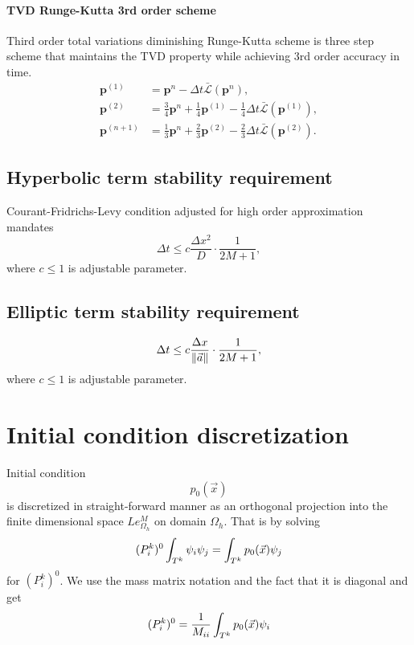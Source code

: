 \paragraph{TVD Runge-Kutta 3rd order scheme}
Third order total variations diminishing Runge-Kutta scheme \cite{Gottlieb2002} 
is three step scheme that maintains the TVD property while achieving 3rd order 
accuracy in time.
\begin{equation}	
	\begin{aligned}
		\mathbf{p}^{(1)} &= \mathbf{p}^n - \Delta t  
		\bar{\mathcal{L}}(\mathbf{p}^n), \\
		\mathbf{\mathbf{p}}^{(2)} &= \frac{3}{4}\mathbf{p}^n 
		+\frac{1}{4}\mathbf{p}^{(1)} - \frac{1}{4}\Delta t 
		 \bar{\mathcal{L}}(\mathbf{p}^{(1)}),\\
		\mathbf{p}^{(n+1)} &= \frac{1}{3}\mathbf{p}^n 
		+\frac{2}{3}\mathbf{p}^{(2)} - \frac{2}{3}\Delta t 
		 \bar{\mathcal{L}}(\mathbf{p}^{(2)}).
	\end{aligned}
\end{equation}


\subsection{Hyperbolic term stability requirement}
Courant-Fridrichs-Levy condition adjusted for high order approximation mandates 
\begin{equation}
	\Delta t \leq c\frac{\Delta x^2}{D} \cdot \frac{1}{2M + 1},
\end{equation} 
where $c \leq 1$ is adjustable parameter.


\subsection{Elliptic term stability requirement}
\begin{equation}\label{eq:cfl_cond}
	\Delta t \leq c\frac{\Delta x}{\left\lVert\vec{a}\right\rVert} \cdot \frac{1}{2M + 1},
\end{equation}
where $c \leq 1$ is adjustable parameter.

\newpage
\section{Initial condition discretization}
Initial condition 
$$
p_0(\vec{x})
$$
is discretized in straight-forward manner as an orthogonal projection into the 
finite dimensional space $Le_{\Omega_h}^{M}$ on domain $\Omega_h$. That is
by solving
\begin{equation}\label{eq:init_proj}
	(P^k_i)^0\int_{T^k}\psi_i\psi_j = \int_{T^k} p_0(\vec{x})\psi_j
\end{equation}
for $(P^k_i)^0$. We use the mass matrix notation and the fact that 
it is diagonal and get
\begin{equation}
	(P^k_i)^0 = \frac{1}{M_{ii}}\int_{T^k} p_0(\vec{x})\psi_i
\end{equation}




